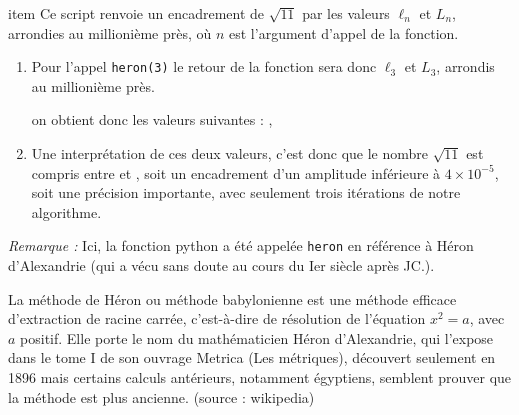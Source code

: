 \begin{enumerate}
item Ce script renvoie un encadrement de $\sqrt{11}$ par les valeurs $\ell_n$ et $L_n$, arrondies au millionième près, où $n$ est l'argument d'appel de la fonction.

	\begin{enumerate}
		\item Pour l'appel \texttt{heron(3)} le retour de la fonction sera donc $\ell_3$ et $L_3$, arrondis au millionième près.

on obtient donc les valeurs suivantes :  , 

		\item Une interprétation de ces deux valeurs, c'est donc que le nombre $\sqrt{11}$ est compris entre  et , soit un encadrement d'un amplitude inférieure à $4\times 10^{-5}$, soit une précision importante, avec seulement trois itérations de notre algorithme.
		\end{enumerate}

	\end{enumerate}
\emph{Remarque :} Ici, la fonction python a été appelée \texttt{heron} en référence à Héron d'Alexandrie (qui a vécu sans doute au cours du Ier siècle après JC.).

La méthode de Héron ou méthode babylonienne est une méthode efficace d'extraction de racine carrée, c’est-à-dire de résolution de l'équation $x^2 = a$, avec $a$ positif. Elle porte le nom du mathématicien Héron d'Alexandrie, qui l'expose dans le tome I de son ouvrage Metrica (Les métriques), découvert seulement en 1896 mais certains calculs antérieurs, notamment égyptiens, semblent prouver que la méthode est plus ancienne.
\hfill(source : wikipedia)
